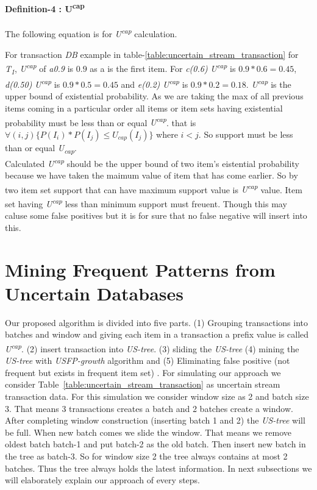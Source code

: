 	\paragraph{Definition-4 : U\textsuperscript{cap}} 
	The following equation is for \emph{U\textsuperscript{cap}}	calculation.
	
	For transaction \emph{DB} example in table-\ref{table:uncertain_stream_transaction} for \emph{T\textsubscript{1}}, \emph{U\textsuperscript{cap}} of \emph{a{0.9}} is $0.9$ as a is the first item. For \emph{c(0.6)} \emph{U\textsuperscript{cap}} is $0.9*0.6=0.45$, \emph{d(0.50)} \emph{U\textsuperscript{cap}} is $0.9*0.5=0.45$ and \emph{e(0.2)} \emph{U\textsuperscript{cap}} is $0.9*0.2=0.18$. \emph{U\textsuperscript{cap}} is the upper bound of existential probability. As we are taking the max of all previous items coming in a particular order all items or item sets having existential probability must be less than or equal \emph{U\textsuperscript{cap}}. that is $\forall(i,j)\{ P(I_i)*P(I_j)\leq U_{cap}(I_j)\}$ where $i < j$. So support must be less than or equal \emph{U\textsubscript{cap}}.\\
	Calculated \emph{U\textsuperscript{cap}} should be the upper bound of two item's eistential probability because we have taken the maimum value of item that has come earlier. So by two item set support that can have maximum support value is \emph{U\textsuperscript{cap}} value. Item set having \emph{U\textsuperscript{cap}} less than minimum support must freuent. Though this may caluse some false positives but it is for sure that no false negative will insert into this. 
	

	
\section{Mining Frequent Patterns from Uncertain Databases}
	Our proposed algorithm is divided into five parts. (1) Grouping transactions into batches and window and giving each item in a transaction a prefix value is called \emph{U\textsuperscript{cap}}. (2) insert transaction into \emph {US-tree}. (3) sliding the \emph {US-tree} (4) mining the \emph {US-tree} with \emph{USFP-growth} algorithm and (5) Eliminating false positive (not frequent but exists in frequent item set) . For simulating our approach we consider Table~\ref{table:uncertain_stream_transaction} as uncertain stream transaction data. For this simulation we consider window size as 2 and batch size 3. That means 3 transactions creates a batch and 2 batches create a window. After completing window construction (inserting batch 1 and 2) the \emph {US-tree} will be full. When new batch comes we slide the window. That means we remove oldest batch batch-1 and put batch-2 as the old batch. Then insert new batch in the tree as batch-3. So for window size 2 the tree always contains at most 2 batches. Thus the tree always holds the latest information. In next subsections we will elaborately explain our approach of every steps.

